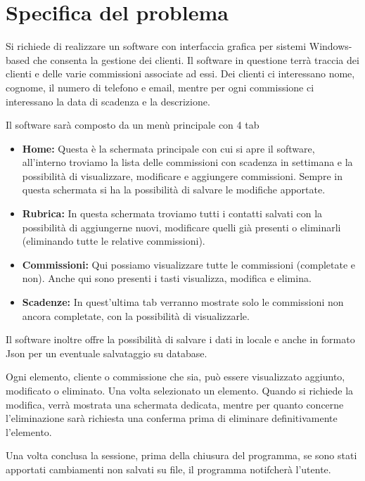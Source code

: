 \section{Specifica del problema}
Si richiede di realizzare un software con interfaccia grafica per sistemi Windows-based che consenta la gestione dei clienti. Il software in questione terrà traccia dei clienti e delle varie commissioni
associate ad essi. Dei clienti ci interessano nome, cognome, il numero di telefono e email, mentre per ogni commissione ci interessano
la data di scadenza e la descrizione.

Il software sarà composto da un menù principale con 4 tab 
\begin{itemize}
        \item \textbf{Home:} Questa è la schermata principale con cui si apre il software, all'interno
        troviamo la lista delle commissioni con scadenza in settimana e la possibilità di visualizzare, modificare
        e aggiungere commissioni. Sempre in questa schermata si ha la possibilità di salvare le modifiche apportate.
        \item \textbf{Rubrica:} In questa schermata troviamo tutti i contatti salvati con la possibilità di aggiungerne nuovi, 
        modificare quelli già presenti o eliminarli (eliminando tutte le relative commissioni).
        \item \textbf{Commissioni:} Qui possiamo visualizzare tutte le commissioni (completate e non). Anche qui sono presenti i tasti 
        visualizza, modifica e elimina.
        \item \textbf{Scadenze:} In quest'ultima tab verranno mostrate solo le commissioni non ancora completate, con la possibilità di visualizzarle.

\end{itemize}


\medskip
Il software inoltre offre la possibilità di salvare i dati in locale e anche in formato Json per un eventuale
salvataggio su database.




\medskip
Ogni elemento, cliente o commissione che sia, può essere visualizzato aggiunto, modificato o eliminato.
Una volta selezionato un elemento.
Quando si richiede la modifica, verrà mostrata una schermata dedicata, mentre per quanto concerne l'eliminazione  
sarà richiesta una conferma prima di eliminare definitivamente l'elemento.

\medskip
Una volta conclusa la sessione, prima della chiusura del programma, se sono stati apportati cambiamenti non salvati su file,
il programma notifcherà l'utente. 